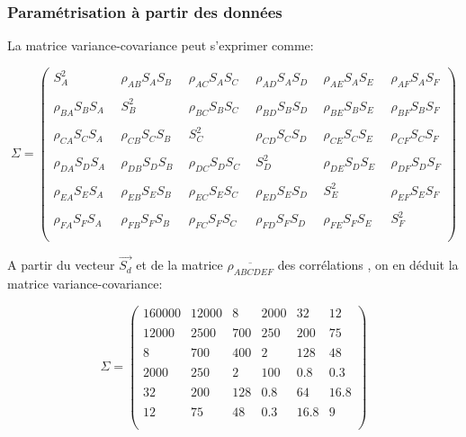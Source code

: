 \documentclass[a4paper]{article}
\begin{document}
\begin{appendices}
\newpage
\subsubsection{Paramétrisation à partir des données}

La matrice variance-covariance peut s'exprimer comme:


$$\Sigma=\begin{pmatrix}
S_{A}^2 &\ \ \rho_{AB}S_{A}S_{B} &\ \ \rho_{AC}S_{A}S_{C} &\ \ \rho_{AD}S_{A}S_{D} &\ \ \rho_{AE}S_{A}S_{E} &\ \ \rho_{AF}S_{A}S_{F}\\ \\
 \rho_{BA}S_{B}S_{A} &\ \ S_{B}^2&\ \ \rho_{BC}S_{B}S_{C}&\ \  \rho_{BD}S_{B}S_{D}&\ \ \rho_{BE}S_{B}S_{E}&\ \  \rho_{BF}S_{B}S_{F}\\ \\
 \rho_{CA}S_{C}S_{A}&\ \  \rho_{CB}S_{C}S_{B}&\ \ S_{C}^2&\ \ \rho_{CD}S_{C}S_{D}&\ \  \rho_{CE}S_{C}S_{E}&\ \  \rho_{CF}S_{C}S_{F}\\ \\
 \rho_{DA}S_{D}S_{A}&\ \  \rho_{DB}S_{D}S_{B}&\ \  \rho_{DC}S_{D}S_{C}&\ \ S_{D}^2&\ \  \rho_{DE}S_{D}S_{E}&\ \  \rho_{DF}S_{D}S_{F}\\ \\
 \rho_{EA}S_{E}S_{A}&\ \  \rho_{EB}S_{E}S_{B}&\ \  \rho_{EC}S_{E}S_{C}&\ \  \rho_{ED}S_{E}S_{D}&\ \ S_{E}^2&\ \  \rho_{EF}S_{E}S_{F}\\ \\
 \rho_{FA}S_{F}S_{A}&\ \  \rho_{FB}S_{F}S_{B}&\ \  \rho_{FC}S_{F}S_{C}&\ \  \rho_{FD}S_{F}S_{D}&\ \  \rho_{FE}S_{F}S_{E}&\ \ S_{F}^2\\ \\
\end{pmatrix}$$

A partir du vecteur $\vec{S_{d}}$ et de la matrice $\overline{\rho_{ABCDEF}}$ des corrélations , on en déduit la matrice variance-covariance:


$$\Sigma=\begin{pmatrix}
160000&12000&8&2000&32&12\\ \\
12000&2500&700&250&200&75\\ \\
8&700&400&2&128&48\\ \\
2000&250&2&100&0.8&0.3\\ \\
32&200&128&0.8&64&16.8\\ \\
12&75&48&0.3&16.8&9\\ \\      
\end{pmatrix}$$
\newpage


\end{appendices}
\end{document}
